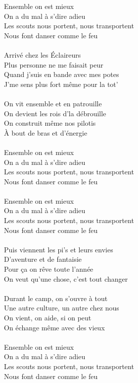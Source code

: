 Ensemble on est mieux\\
On a du mal à s'dire adieu\\
Les scouts nous portent, nous transportent\\
Nous font danser comme le feu\\\\
Arrivé chez les Éclaireurs\\
Plus personne ne me faisait peur\\
Quand j'suis en bande avec mes potes\\
J'me sens plus fort même pour la tot'\\\\
On vit ensemble et en patrouille\\
On devient les rois d'la débrouille\\
On construit même nos pilotis\\
À bout de bras et d'énergie\\\\
Ensemble on est mieux\\
On a du mal à s'dire adieu\\
Les scouts nous portent, nous transportent\\
Nous font danser comme le feu\\\\
Ensemble on est mieux\\
On a du mal à s'dire adieu\\
Les scouts nous portent, nous transportent\\
Nous font danser comme le feu\\\\
Puis viennent les pi's et leurs envies\\
D'aventure et de fantaisie\\
Pour ça on rêve toute l'année\\
On veut qu'une chose, c'est tout changer\\\\
Durant le camp, on s'ouvre à tout\\
Une autre culture, un autre chez nous\\
On vient, on aide, si on peut\\
On échange même avec des vieux\\\\
Ensemble on est mieux\\
On a du mal à s'dire adieu\\
Les scouts nous portent, nous transportent\\
Nous font danser comme le feu\\\\
